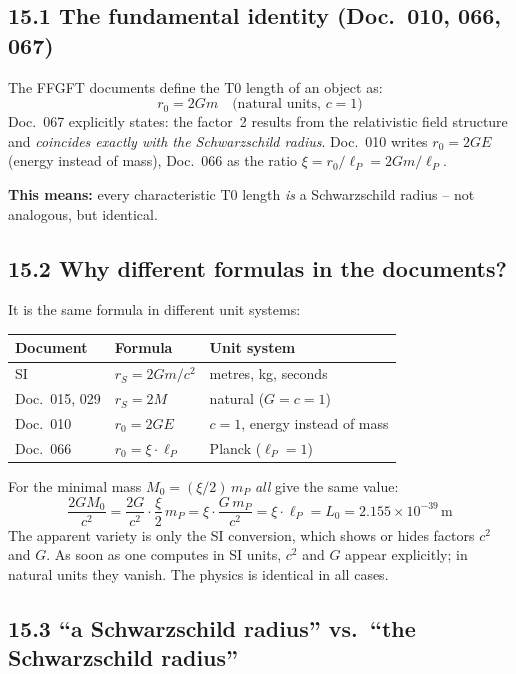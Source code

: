 \subsection*{15.1 The fundamental identity (Doc.~010, 066, 067)}

The FFGFT documents define the T0 length of an object as:
\[
  r_0 = 2Gm \quad\text{(natural units, } c=1\text{)}
\]
Doc.~067 explicitly states: the factor~2 results from the
relativistic field structure and \emph{coincides exactly with the
Schwarzschild radius}. Doc.~010 writes $r_0 = 2GE$
(energy instead of mass), Doc.~066 as the ratio $\xi = r_0/\ell_P = 2Gm/\ell_P$.

\textbf{This means:} every characteristic T0 length \emph{is}
a Schwarzschild radius -- not analogous, but identical.

\subsection*{15.2 Why different formulas in the documents?}

It is the same formula in different unit systems:

\begin{center}
\begin{tabular}{p{3cm}p{3.5cm}p{4.5cm}}
\toprule
\textbf{Document} & \textbf{Formula} & \textbf{Unit system} \\
\midrule
SI & $r_S = 2Gm/c^2$ & metres, kg, seconds \\
Doc.~015, 029 & $r_S = 2M$ & natural ($G=c=1$) \\
Doc.~010 & $r_0 = 2GE$ & $c=1$, energy instead of mass \\
Doc.~066 & $r_0 = \xi\cdot\ell_P$ & Planck ($\ell_P=1$) \\
\bottomrule
\end{tabular}
\end{center}

For the minimal mass $M_0 = (\xi/2)\,m_P$ \emph{all} give the same value:
\[
  \frac{2G M_0}{c^2}
  = \frac{2G}{c^2}\cdot\frac{\xi}{2}\,m_P
  = \xi\cdot\frac{G\,m_P}{c^2}
  = \xi\cdot\ell_P = L_0 = 2{.}155\times10^{-39}\,\text{m}
\]
The apparent variety is only the SI conversion, which shows or hides
factors $c^2$ and $G$. As soon as one computes in SI units, $c^2$ and
$G$ appear explicitly; in natural units they vanish. The physics is
identical in all cases.

\subsection*{15.3 ``a Schwarzschild radius'' vs.\ ``the Schwarzschild radius''}


